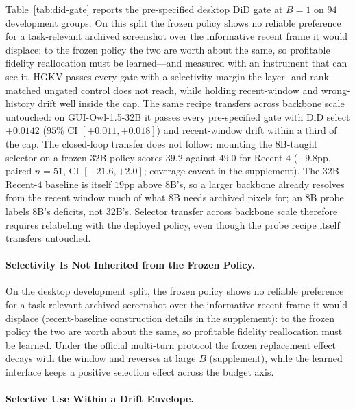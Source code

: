 \documentclass[letterpaper]{article} %
\newcommand{\hgkv}{\textsc{HGKV}}
\begin{document}
Table~\ref{tab:did-gate} reports the pre-specified desktop DiD gate at
$B{=}1$ on $94$ development groups. On this split the frozen policy shows
no reliable preference for a task-relevant archived screenshot over the
informative recent frame it would displace: to the frozen policy the two
are worth about the same, so profitable fidelity reallocation must be
learned---and measured with an instrument that can see it. \hgkv{} passes
every gate with a selectivity margin the layer- and rank-matched ungated
control does not reach, while holding recent-window and wrong-history
drift well inside the cap. The same recipe transfers across backbone
scale untouched: on GUI-Owl-1.5-32B it passes every pre-specified gate
with DiD select $+0.0142$ ($95\%$ CI $[+0.011,+0.018]$) and recent-window
drift within a third of the cap. The closed-loop transfer does not follow:
mounting the 8B-taught selector on a frozen 32B policy scores $39.2$
against $49.0$ for Recent-$4$ ($-9.8$pp, paired $n{=}51$, CI
$[-21.6,+2.0]$; coverage caveat in the supplement). The 32B Recent-$4$
baseline is itself $19$pp above 8B's, so a larger backbone already
resolves from the recent window much of what 8B needs archived pixels
for; an 8B probe labels 8B's deficits, not 32B's. Selector transfer
across backbone scale therefore requires relabeling with the deployed
policy, even though the probe recipe itself transfers untouched.

\paragraph{Selectivity Is Not Inherited from the Frozen Policy.}

On the desktop development split, the frozen policy shows no reliable
preference for a task-relevant archived screenshot over the informative
recent frame it would displace (recent-baseline construction details in
the supplement): to the frozen policy the two are worth about the same,
so profitable fidelity reallocation must be learned. Under the official
multi-turn protocol the frozen replacement effect decays with the window
and reverses at large $B$ (supplement), while the learned
interface keeps a positive selection effect across the budget axis.

\paragraph{Selective Use Within a Drift Envelope.}
\end{document}
